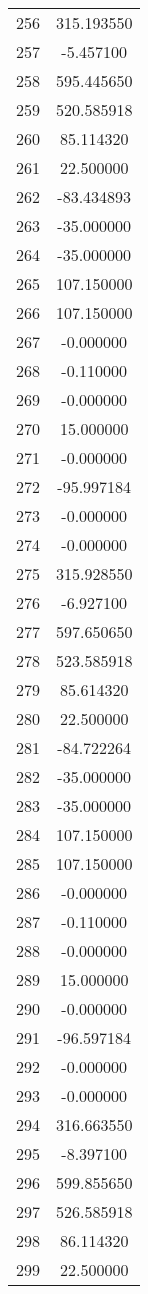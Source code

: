 \documentclass[12pt]{article}
\begin{document}
\begin{longtable}{@{}cc@{}}
256 & 315.193550 \\
257 & -5.457100 \\
258 & 595.445650 \\
259 & 520.585918 \\
260 & 85.114320 \\
261 & 22.500000 \\
262 & -83.434893 \\
263 & -35.000000 \\
264 & -35.000000 \\
265 & 107.150000 \\
266 & 107.150000 \\
267 & -0.000000 \\
268 & -0.110000 \\
269 & -0.000000 \\
270 & 15.000000 \\
271 & -0.000000 \\
272 & -95.997184 \\
273 & -0.000000 \\
274 & -0.000000 \\
275 & 315.928550 \\
276 & -6.927100 \\
277 & 597.650650 \\
278 & 523.585918 \\
279 & 85.614320 \\
280 & 22.500000 \\
281 & -84.722264 \\
282 & -35.000000 \\
283 & -35.000000 \\
284 & 107.150000 \\
285 & 107.150000 \\
286 & -0.000000 \\
287 & -0.110000 \\
288 & -0.000000 \\
289 & 15.000000 \\
290 & -0.000000 \\
291 & -96.597184 \\
292 & -0.000000 \\
293 & -0.000000 \\
294 & 316.663550 \\
295 & -8.397100 \\
296 & 599.855650 \\
297 & 526.585918 \\
298 & 86.114320 \\
299 & 22.500000 \\

\end{longtable}
\end{document}
